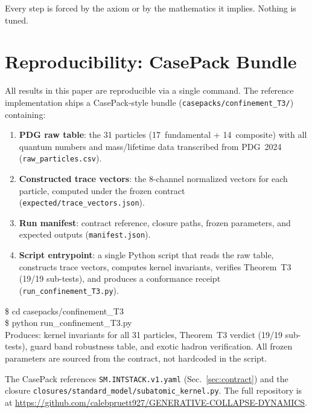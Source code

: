 \documentclass[
  aps,
  prd,
  twocolumn,
  superscriptaddress,
  nofootinbib,
  floatfix
]{revtex4-2}
\begin{document}
Every step is forced by the axiom or by the mathematics it
implies.  Nothing is tuned.


\section{Reproducibility: CasePack Bundle}\label{sec:casepack}

All results in this paper are reproducible via a single command.
The reference implementation ships a CasePack-style bundle
(\texttt{casepacks/confinement\_T3/}) containing:

\begin{enumerate}
\item \textbf{PDG raw table}: the 31 particles (17~fundamental +
  14~composite) with all quantum numbers and mass/lifetime data
  transcribed from PDG~2024~\cite{pdg2024}
  (\texttt{raw\_particles.csv}).
\item \textbf{Constructed trace vectors}: the 8-channel normalized
  vectors for each particle, computed under the frozen contract
  (\texttt{expected/trace\_vectors.json}).
\item \textbf{Run manifest}: contract reference, closure paths,
  frozen parameters, and expected outputs
  (\texttt{manifest.json}).
\item \textbf{Script entrypoint}: a single Python script that
  reads the raw table, constructs trace vectors, computes kernel
  invariants, verifies Theorem~T3 (19/19 sub-tests), and
  produces a conformance receipt
  (\texttt{run\_confinement\_T3.py}).
\end{enumerate}

\begin{tcolorbox}[
  colback=PreambleBox, colframe=EpsBlue,
  title=One-Command Rerun, fonttitle=\bfseries\small,
  boxrule=0.8pt, arc=2pt, left=8pt, right=8pt
]
\small\ttfamily
\$ cd casepacks/confinement\_T3 \\
\$ python run\_confinement\_T3.py \\[2pt]
\rmfamily\small
Produces: kernel invariants for all 31 particles,
Theorem~T3 verdict (19/19 sub-tests), guard band
robustness table, and exotic hadron verification.
All frozen parameters are sourced from the contract,
not hardcoded in the script.
\end{tcolorbox}

The CasePack references \texttt{SM.INTSTACK.v1.yaml}
(Sec.~\ref{sec:contract}) and the closure
\texttt{closures/standard\_model/subatomic\_kernel.py}.
The full repository is at
\url{https://github.com/calebpruett927/GENERATIVE-COLLAPSE-DYNAMICS}.
\end{document}

